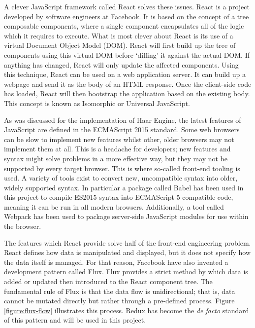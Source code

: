    A clever JavaScript framework called React solves these issues. React is a project developed by software engineers at Facebook. It is based on the concept of a tree composable components, where a single component encapsulates all of the logic which it requires to execute. What is most clever about React is its use of a virtual Document Object Model (DOM). React will first build up the tree of components using this virtual DOM before `diffing' it against the actual DOM. If anything has changed, React will only update the affected components. Using this technique, React can be used on a web application server. It can build up a webpage and send it as the body of an HTML response. Once the client-side code has loaded, React will then bootstrap the application based on the existing body. This concept is known as Isomorphic or Universal JavaScript.

    As was discussed for the implementation of Haar Engine, the latest features of JavaScript are defined in the ECMAScript 2015 standard. Some web browsers can be slow to implement new features whilst other, older browsers may not implement them at all. This is a headache for developers; new features and syntax might solve problems in a more effective way, but they may not be supported by every target browser. This is where so-called front-end tooling is used. A variety of tools exist to convert new, uncompatible syntax into older, widely supported syntax. In particular a package called Babel has been used in this project to compile ES2015 syntax into ECMAScript 5 compatible code, meaning it can be run in all modern browsers. Additionally, a tool called Webpack has been used to package server-side JavaScript modules for use within the browser.

    The features which React provide solve half of the front-end engineering problem. React defines how data is manipulated and displayed, but it does not specify how the data itself is managed. For that reason, Facebook have also invented a development pattern called Flux. Flux provides a strict method by which data is added or updated then introduced to the React component tree. The fundamental rule of Flux is that the data flow is unidirectional; that is, data cannot be mutated directly but rather through a pre-defined process. Figure \ref{figure:flux-flow} illustrates this process. Redux has become the \textit{de facto} standard of this pattern and will be used in this project.

